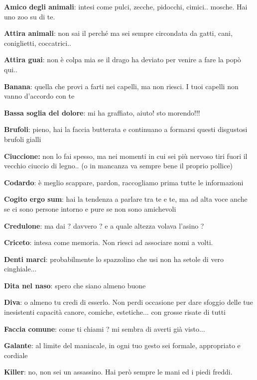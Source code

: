 \documentclass[a4paper,11pt,twoside,openany]{book}
\begin{document}
\textbf{Amico degli animali}: intesi come pulci, zecche, pidocchi, cimici.. mosche. Hai uno zoo su di te.

\textbf{Attira animali}: non sai il perché ma sei sempre circondata da gatti, cani, coniglietti, coccatrici..

\textbf{Attira guai}: non è colpa mia se il drago ha deviato per venire a fare la popò qui..

\textbf{Banana}: quella che provi a farti nei capelli, ma non riesci.
I tuoi capelli non vanno d'accordo con te

\textbf{Bassa soglia del dolore}: mi ha graffiato, aiuto! sto morendo!!!

\textbf{Brufoli}: pieno, hai la faccia butterata e continuano a formarsi questi disgustosi brufoli gialli

\textbf{Ciuccione:} non lo fai spesso, ma nei momenti in cui sei più nervoso tiri fuori il vecchio ciuccio di legno.. (o in mancanza va sempre bene il proprio pollice)

\textbf{Codardo}: è meglio scappare, pardon, raccogliamo prima tutte le informazioni

\textbf{Cogito ergo sum}: hai la tendenza a parlare tra te e te, ma ad alta voce anche se ci sono persone intorno e pure se non sono amichevoli

\textbf{Credulone}: ma dai ? davvero ? e a quale altezza volava l'asino ?

\textbf{Criceto}: intesa come memoria. Non riesci ad associare nomi a volti.

\textbf{Denti marci}: probabilmente lo spazzolino che usi non ha setole di vero cinghiale...

\textbf{Dita nel naso}: spero che siano almeno buone

\textbf{Diva}: o almeno tu credi di esserlo. Non perdi occasione per dare sfoggio delle tue inesistenti capacità canore, comiche, estetiche... con grosse risate di tutti

\textbf{Faccia comune}: come ti chiami ? mi sembra di averti già visto...

\textbf{Galante}: al limite del maniacale, in ogni tuo gesto sei formale, appropriato e cordiale

\textbf{Killer}: no, non sei un assassino. Hai però sempre le mani ed i piedi freddi.
\end{document}

